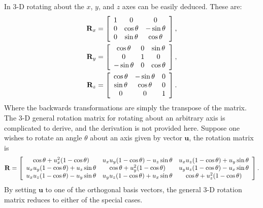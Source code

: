 In 3-D rotating about the $x$, $y$, and $z$ axes can be easily deduced. These are:
\begin{subequations}
\begin{align}
  \mathbf{R}_x = \left[ \begin{array}{c c c} 1 & 0 & 0 \\ 0 & \cos \theta & -\sin \theta \\ 0 & \sin \theta & \cos \theta \\ \end{array} \right] , \\
  \mathbf{R}_y = \left[ \begin{array}{c c c} \cos \theta & 0 & \sin \theta \\ 0 & 1 & 0 \\ -\sin \theta & 0 & \cos \theta \\ \end{array} \right] , \\
  \mathbf{R}_z = \left[ \begin{array}{c c c} \cos \theta & -\sin \theta & 0 \\  \sin \theta & \cos \theta & 0 \\ 0 & 0 & 1 \end{array} \right] .
\end{align}
\end{subequations}
Where the backwards transformations are simply the transpose of the matrix. The 3-D general rotation matrix for rotating about an arbitrary axis is complicated to derive, and the derivation is not provided here. Suppose one wishes to rotate an angle $\theta$ about an axis given by vector $\mathbf{u}$, the rotation matrix is
\begin{align}
  \mathbf{R} = \left[ \begin{array}{c c c} 
  \cos\theta + u_x^2 ( 1 - \cos\theta ) 		& u_x u_y ( 1 - \cos\theta ) - u_z \sin\theta 	& u_x u_z ( 1 - \cos\theta ) + u_y \sin\theta 	\\
  u_x u_y ( 1 - \cos\theta ) + u_z \sin\theta 	& \cos\theta + u_y^2 ( 1 - \cos\theta ) 		& u_y u_z ( 1 - \cos\theta ) - u_x \sin\theta 	\\ 
  u_x u_z ( 1 - \cos\theta ) - u_y \sin\theta 	& u_y u_z ( 1 - \cos\theta ) + u_x \sin\theta 	& \cos\theta + u_z^2 ( 1 - \cos\theta ) 		\\ \end{array} \right] .
\end{align}
By setting $\mathbf{u}$ to one of the orthogonal basis vectors, the general 3-D rotation matrix reduces to either of the special cases.



